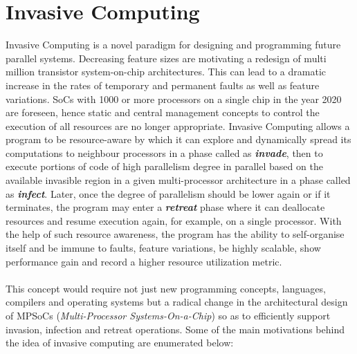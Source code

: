 \chapter{Invasive Computing}
\label{chapter:invasive computing}
Invasive Computing\cite{teich} is a novel paradigm for designing and programming future parallel systems. Decreasing feature sizes are motivating a redesign of multi million transistor system-on-chip architectures. This can lead to a dramatic increase in the rates of temporary and permanent faults as well as feature variations. SoCs with 1000 or more processors on a single chip in the year 2020 are foreseen, hence static and central management concepts to control the execution of all resources are no longer appropriate. Invasive Computing allows a program to be resource-aware by which it can explore and dynamically spread its computations to neighbour processors in a phase called as \textbf{\textit{invade}}, then to execute portions of code of high parallelism degree in parallel based on the available invasible region in a given multi-processor architecture in a phase called as \textbf{\textit{infect}}. Later, once the degree of parallelism should be lower again or if it terminates, the program may enter a \textbf{\textit{retreat}} phase where it can deallocate resources and resume execution again, for example, on a single processor. With the help of such resource awareness, the program has the ability to self-organise itself and be immune to faults, feature variations, be highly scalable, show performance gain and record a higher resource utilization metric.\\ \\
This concept would require not just new programming concepts, languages, compilers and operating systems\cite{da2015exascale} but a radical change in the architectural design of MPSoCs (\textit{Multi-Processor Systems-On-a-Chip}) so as to efficiently support invasion, infection and retreat operations. Some of the main motivations behind the idea of invasive computing are enumerated below:
